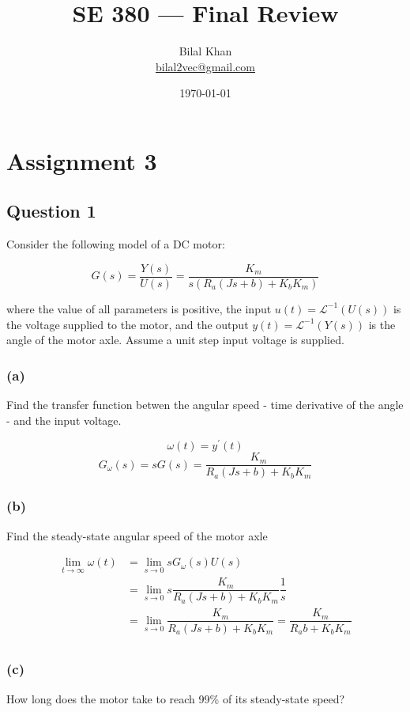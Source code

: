 \documentclass[11pt]{article}
\title{SE 380 — Final Review}
\author{Bilal Khan\\
\href{mailto:bilal2vec@gmail.com}{bilal2vec@gmail.com}}
\date{\today}
\begin{document}
\maketitle

\tableofcontents

\section{Assignment 3}

\subsection{Question 1}

Consider the following model of a DC motor:

\[ G(s) = \dfrac{Y(s)}{U(s)} = \dfrac{K_m}{s(R_a (Js + b) + K_b K_m)} \]

where the value of all parameters is positive, the input $u(t) = \mathcal{L}^{-1}(U(s))$ is the voltage supplied to the motor, and the output $y(t) = \mathcal{L}^{-1}(Y(s))$ is the angle of the motor axle. Assume a unit step input voltage is supplied. 

\subsubsection{(a)} Find the transfer function betwen the angular speed - time derivative of the angle - and the input voltage.

\[ \omega(t) = y^\prime(t) \]
\[  G_\omega(s) = s G(s) = \dfrac{K_m}{R_a (Js + b) + K_b K_m} \]

\subsubsection{(b)} Find the steady-state angular speed of the motor axle

\begin{align*}
  \lim_{t \xrightarrow{} \infty} \omega(t) &= \lim_{s \xrightarrow{} 0} s G_\omega(s) U(s) \\
  &= \lim_{s \xrightarrow{} 0} s \dfrac{K_m}{R_a (Js + b) + K_b K_m} \dfrac{1}{s} \\
  &= \lim_{s \xrightarrow{} 0} \dfrac{K_m}{R_a (Js + b) + K_b K_m} = \dfrac{K_m}{R_a b + K_b K_m} \\
\end{align*}

\subsubsection{(c)} How long does the motor take to reach 99\% of its steady-state speed?
\end{document}
